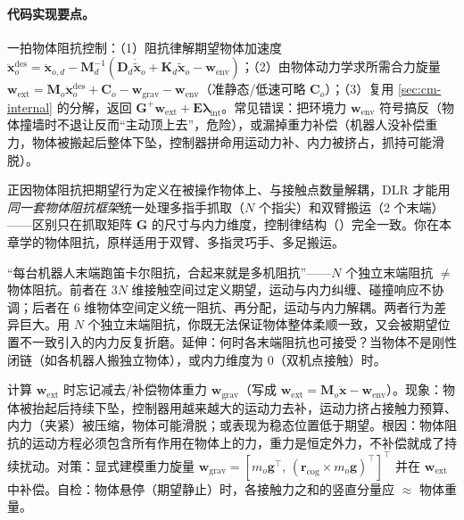 \paragraph{代码实现要点。}
一拍物体阻抗控制：（1）阻抗律解期望物体加速度 $\ddot{\mathbf{x}}_o^{\text{des}}=\ddot{\mathbf{x}}_{o,d}-\mathbf{M}_d^{-1}(\mathbf{D}_d\dot{\tilde{\mathbf{x}}}_o+\mathbf{K}_d\tilde{\mathbf{x}}_o-\mathbf{w}_{\text{env}})$；（2）由物体动力学求所需合力旋量 $\mathbf{w}_{\text{ext}}=\mathbf{M}_o\ddot{\mathbf{x}}_o^{\text{des}}+\mathbf{C}_o-\mathbf{w}_{\text{grav}}-\mathbf{w}_{\text{env}}$（准静态/低速可略 $\mathbf{C}_o$）；（3）复用 \cref{sec:cm-internal} 的分解，返回 $\mathbf{G}^{+}\mathbf{w}_{\text{ext}}+\mathbf{E}\boldsymbol{\lambda}_{\text{int}}$。常见错误：把环境力 $\mathbf{w}_{\text{env}}$ 符号搞反（物体撞墙时不退让反而“主动顶上去”，危险），或漏掉重力补偿（机器人没补偿重力，物体被搬起后整体下坠，控制器拼命用运动力补、内力被挤占，抓持可能滑脱）。

\begin{insight}
正因物体阻抗把期望行为定义在被操作物体上、与接触点数量解耦，DLR 才能用\emph{同一套物体阻抗框架}统一处理多指手抓取（$N$ 个指尖）和双臂搬运（$2$ 个末端）——区别只在抓取矩阵 $\mathbf{G}$ 的尺寸与内力维度，控制律结构（）完全一致。你在本章学的物体阻抗，原样适用于双臂、多指灵巧手、多足搬运。
\end{insight}

\begin{pitfall}
“每台机器人末端跑笛卡尔阻抗，合起来就是多机阻抗”——$N$ 个独立末端阻抗 $\ne$ 物体阻抗。前者在 $3N$ 维接触空间过定义期望，运动与内力纠缠、碰撞响应不协调；后者在 $6$ 维物体空间定义统一阻抗、再分配，运动与内力解耦。两者行为差异巨大。用 $N$ 个独立末端阻抗，你既无法保证物体整体柔顺一致，又会被期望位置不一致引入的内力反复折磨。延伸：何时各末端阻抗也可接受？当物体不是刚性闭链（如各机器人搬独立物体），或内力维度为 $0$（双机点接触）时。
\end{pitfall}

\begin{pitfall}
计算 $\mathbf{w}_{\text{ext}}$ 时忘记减去/补偿物体重力 $\mathbf{w}_{\text{grav}}$（写成 $\mathbf{w}_{\text{ext}}=\mathbf{M}_o\ddot{\mathbf{x}}-\mathbf{w}_{\text{env}}$）。现象：物体被抬起后持续下坠，控制器用越来越大的运动力去补，运动力挤占接触力预算、内力（夹紧）被压缩，物体可能滑脱；或表现为稳态位置低于期望。根因：物体阻抗的运动方程必须包含所有作用在物体上的力，重力是恒定外力，不补偿就成了持续扰动。对策：显式建模重力旋量 $\mathbf{w}_{\text{grav}}=[m_o\mathbf{g}^\top,\,(\mathbf{r}_{\text{cog}}\times m_o\mathbf{g})^\top]^\top$ 并在 $\mathbf{w}_{\text{ext}}$ 中补偿。自检：物体悬停（期望静止）时，各接触力之和的竖直分量应 $\approx$ 物体重量。
\end{pitfall}

